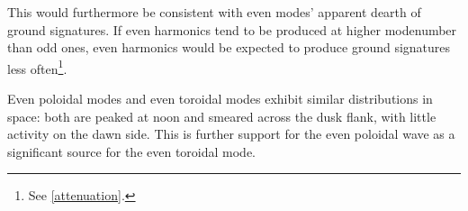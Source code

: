 This would furthermore be consistent with even modes' apparent dearth of ground signatures\cite{takahashi_1992}. If even harmonics tend to be produced at higher modenumber than odd ones, even harmonics would be expected to produce ground signatures less often\footnote{See \cref{attenuation}. }. 

Even poloidal modes and even toroidal modes exhibit similar distributions in space: both are peaked at noon and smeared across the dusk flank, with little activity on the dawn side. This is further support for the even poloidal wave as a significant source for the even toroidal mode. 








